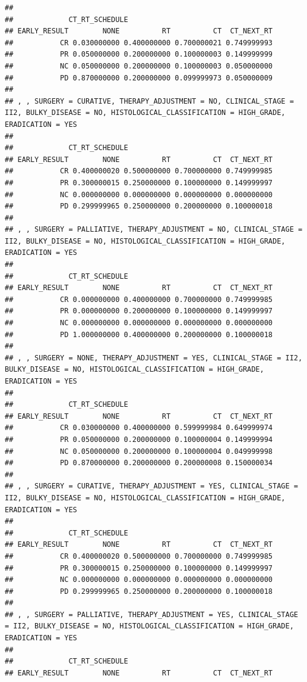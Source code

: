 \documentclass[]{article}
\begin{document}
\begin{verbatim}
## 
##             CT_RT_SCHEDULE
## EARLY_RESULT        NONE          RT          CT  CT_NEXT_RT
##           CR 0.030000000 0.400000000 0.700000021 0.749999993
##           PR 0.050000000 0.200000000 0.100000003 0.149999999
##           NC 0.050000000 0.200000000 0.100000003 0.050000000
##           PD 0.870000000 0.200000000 0.099999973 0.050000009
## 
## , , SURGERY = CURATIVE, THERAPY_ADJUSTMENT = NO, CLINICAL_STAGE = II2, BULKY_DISEASE = NO, HISTOLOGICAL_CLASSIFICATION = HIGH_GRADE, ERADICATION = YES
## 
##             CT_RT_SCHEDULE
## EARLY_RESULT        NONE          RT          CT  CT_NEXT_RT
##           CR 0.400000020 0.500000000 0.700000000 0.749999985
##           PR 0.300000015 0.250000000 0.100000000 0.149999997
##           NC 0.000000000 0.000000000 0.000000000 0.000000000
##           PD 0.299999965 0.250000000 0.200000000 0.100000018
## 
## , , SURGERY = PALLIATIVE, THERAPY_ADJUSTMENT = NO, CLINICAL_STAGE = II2, BULKY_DISEASE = NO, HISTOLOGICAL_CLASSIFICATION = HIGH_GRADE, ERADICATION = YES
## 
##             CT_RT_SCHEDULE
## EARLY_RESULT        NONE          RT          CT  CT_NEXT_RT
##           CR 0.000000000 0.400000000 0.700000000 0.749999985
##           PR 0.000000000 0.200000000 0.100000000 0.149999997
##           NC 0.000000000 0.000000000 0.000000000 0.000000000
##           PD 1.000000000 0.400000000 0.200000000 0.100000018
## 
## , , SURGERY = NONE, THERAPY_ADJUSTMENT = YES, CLINICAL_STAGE = II2, BULKY_DISEASE = NO, HISTOLOGICAL_CLASSIFICATION = HIGH_GRADE, ERADICATION = YES
## 
##             CT_RT_SCHEDULE
## EARLY_RESULT        NONE          RT          CT  CT_NEXT_RT
##           CR 0.030000000 0.400000000 0.599999984 0.649999974
##           PR 0.050000000 0.200000000 0.100000004 0.149999994
##           NC 0.050000000 0.200000000 0.100000004 0.049999998
##           PD 0.870000000 0.200000000 0.200000008 0.150000034
## 
## , , SURGERY = CURATIVE, THERAPY_ADJUSTMENT = YES, CLINICAL_STAGE = II2, BULKY_DISEASE = NO, HISTOLOGICAL_CLASSIFICATION = HIGH_GRADE, ERADICATION = YES
## 
##             CT_RT_SCHEDULE
## EARLY_RESULT        NONE          RT          CT  CT_NEXT_RT
##           CR 0.400000020 0.500000000 0.700000000 0.749999985
##           PR 0.300000015 0.250000000 0.100000000 0.149999997
##           NC 0.000000000 0.000000000 0.000000000 0.000000000
##           PD 0.299999965 0.250000000 0.200000000 0.100000018
## 
## , , SURGERY = PALLIATIVE, THERAPY_ADJUSTMENT = YES, CLINICAL_STAGE = II2, BULKY_DISEASE = NO, HISTOLOGICAL_CLASSIFICATION = HIGH_GRADE, ERADICATION = YES
## 
##             CT_RT_SCHEDULE
## EARLY_RESULT        NONE          RT          CT  CT_NEXT_RT

\end{verbatim}
\end{document}

